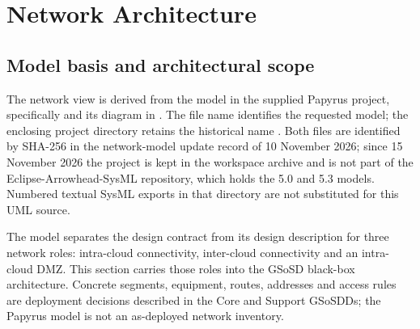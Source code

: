 \section{Network Architecture}
\label{sec:network-architecture}
\subsection{Model basis and architectural scope}
The network view is derived from the  model in the supplied Papyrus project, specifically  and its  diagram in  \cite{arrowhead52NetworkModel20261110}. The file name identifies the requested model; the enclosing project directory retains the historical name . Both files are identified by SHA-256 in the network-model update record of 10 November 2026; since 15 November 2026 the project is kept in the workspace archive and is not part of the Eclipse-Arrowhead-SysML repository, which holds the 5.0 and 5.3 models. Numbered textual SysML exports in that directory are not substituted for this UML source.

The model separates the design contract from its design description for three network roles: intra-cloud connectivity, inter-cloud connectivity and an intra-cloud DMZ. This section carries those roles into the GSoSD black-box architecture. Concrete segments, equipment, routes, addresses and access rules are deployment decisions described in the Core and Support GSoSDDs; the Papyrus model is not an as-deployed network inventory.

